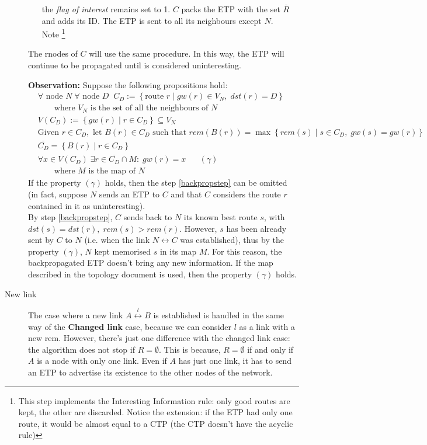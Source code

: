 \documentclass[a4paper]{article}
\newcommand{\T}[1]{\textrm{#1}}
\newcommand{\pgra}[1]{\left\{#1\right\}}
\newcommand{\eal}[1]{{\begin{align*} #1 \end{align*}}}
\def\ove#1{{\overline{#1}}}
\newcommand{\qq}{\qquad}
\def\0{{\emptyset}}
\def\^{{\cap}}
\def\({{\subseteq}}
\def\'{{\;\;\;}}
\begin{document}
\begin{description}
\begin{enumerate}
		the \emph{flag of interest} remains set to 1.
		$C$ packs the ETP with the set $\ove R$ and adds its ID.
		The ETP is sent to all its neighbours except $N$.\\
		Note \footnote{This step implements the Interesting
		Information rule: only
		good routes are kept, the other are discarded. Notice
		the extension: if the ETP had only one route, it would be
		almost equal to a CTP (the CTP doesn't have the acyclic rule)}
	\end{enumerate}
	The rnodes of $C$ will use the same procedure. In this way, the ETP
	will continue to be propagated until is considered uninteresting.

	\textbf{Observation: }Suppose the following propositions hold:
	\eal{
	&\forall \T{ node }N\;\forall \T{ node }D\;\;
	C_D:= \pgra{\T{route }r\;|\;gw(r)\in V_N,\;dst(r)=D}\\
	&\qq\T{where $V_N$ is the set of all the neighbours of $N$}\\
	&V(C_D):=\pgra{gw(r)\;|\;r\in C_D} \( V_N\\
	&\T{Given } r \in C_D, \T{ let } B(r)\in C_D \T{ such that } 
	rem(B(r))=\max\pgra{rem(s)\;|\;s\in C_D,\;gw(s)=gw(r)}\\
	&\ove {C_D} = \pgra{B(r)\;|\;r\in C_D}\\
	&\forall x\in V(C_D)\;\exists r\in
	\ove{C_D}\^M:\;gw(r)=x\'\'(\gamma)\\
	&\qq\T{where $M$ is the map of $N$}
	}
	If the property $(\gamma)$ holds, then the step \ref{backpropstep}
	can be omitted (in fact, suppose $N$ sends an ETP to $C$ and that $C$
	considers the route $r$ contained in it as uninteresting).\\
	By step \ref{backpropstep}, $C$ sends back to $N$ its known best route
	$s$, with $dst(s)=dst(r),\;rem(s)>rem(r)$. However, $s$ has been
	already sent by $C$ to $N$ (i.e. when the link $N\leftrightarrow C$
	was established), thus by the property $(\gamma)$, $N$ kept memorised
	$s$ in its map $M$. For this reason, the backpropagated ETP doesn't
	bring any new information. If the map described in the topology
	document\cite{ntktopology} is used, then the property $(\gamma)$
	holds.
	
	\item[New link]
	The case where a new link $A \stackrel{l}{\leftrightarrow} B$
	is established is handled  in the same way of the
	\textbf{Changed link} case, because we can consider $l$ as a link with
	a new rem. However, there's just one difference with the changed link
	case: the algorithm does not stop if $R=\0$. This is because, $R=\0$
	if and only if $A$
	is a node with only one link. Even if $A$ has just one link, it 
	has to send an ETP to advertise its existence to the other nodes of the network.


\end{description}
\end{document}
